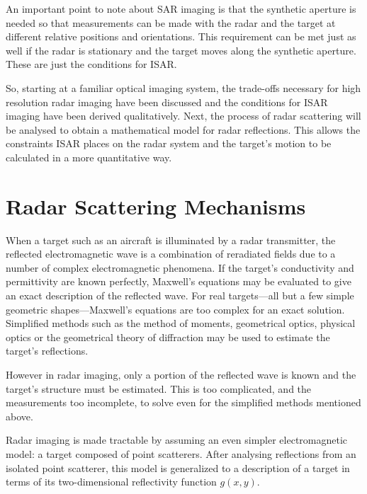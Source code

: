An important point to note about SAR imaging is that the synthetic aperture
is needed so that measurements can be made with the radar and the target at
different relative positions and orientations.  This requirement can be met
just as well if the radar is stationary and the target moves along the
synthetic aperture.  These are just the conditions for ISAR.

So, starting at a familiar optical imaging system, the trade-offs
necessary for high resolution radar imaging have been discussed and 
the conditions for ISAR imaging have been derived qualitatively.  Next, the
process of radar scattering will be analysed to obtain a mathematical model
for radar reflections.  This allows the constraints ISAR places on the radar 
system and the target's motion to be calculated in a more quantitative way.


\section{Radar Scattering Mechanisms}


When a target such as an aircraft is illuminated by a radar transmitter, the
reflected electromagnetic wave is a combination of reradiated fields due to
a number of complex electromagnetic phenomena.  If the target's conductivity
and permittivity are known perfectly, Maxwell's equations may be evaluated to
give an exact description of the reflected wave. For real targets---all but
a few simple geometric shapes---Maxwell's equations are too complex for an
exact solution.  Simplified methods such as the method of moments,
geometrical optics, physical optics or the geometrical theory of diffraction
may be used to estimate the target's reflections.

However in radar imaging, only a portion of the reflected wave is known and
the target's structure must be estimated.  This is too complicated, and the
measurements too incomplete, to solve even for the simplified methods
mentioned above.  

Radar imaging is made tractable by assuming an even simpler electromagnetic
model: a target composed of point scatterers.  After analysing reflections
from an isolated point scatterer, this model is generalized to a description
of a target in terms of its two-dimensional reflectivity function $g(x,y)$.


